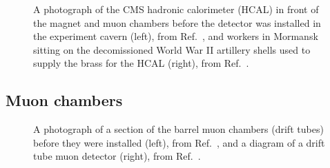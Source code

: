 \begin{figure}[htb]
    \centering
    \quad
    \caption{
        A photograph of the CMS hadronic calorimeter (HCAL) in front of the magnet and muon chambers before the detector was installed in the experiment cavern (left), from Ref.~\cite{Brice:1431485}, and workers in Mormansk sitting on the decomissioned World War II artillery shells used to supply the brass for the HCAL (right), from Ref.~\cite{GinterRussianDudes}.
    }
    \label{fig:cms_hcal}
\end{figure}

\subsection{Muon chambers}

\begin{figure}[htb]
    \centering
    \quad
    \caption{
        A photograph of a section of the barrel muon chambers (drift tubes) before they were installed (left), from Ref.~\cite{Hoch:1274451}, and a diagram of a drift tube muon detector (right), from Ref.~\cite{CMSWebMuonDT}. 
    }
    \label{fig:cms_muon}
\end{figure}

